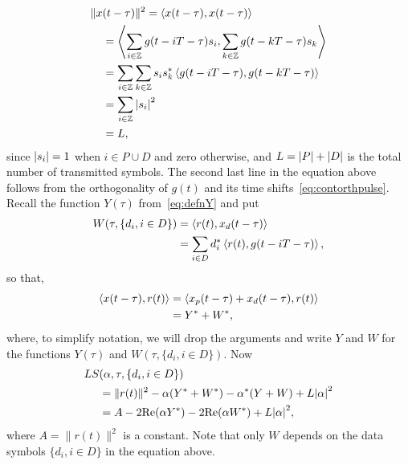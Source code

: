 \documentclass[journal]{IEEEtranTCOM}
\begin{document}
\begin{align*}
\|x&(t - \tau)\|^2 = \left\langle x(t - \tau) , x(t - \tau) \right\rangle \\
&= \left\langle \sum_{i\in{\mathbb Z}}g(t - iT - \tau)s_i , \sum_{k\in{\mathbb Z}}g(t - kT - \tau)s_k \right\rangle \\
&= \sum_{i\in{\mathbb Z}}\sum_{k\in{\mathbb Z}} s_is_k^* \left\langle g(t - iT - \tau) , g(t - kT - \tau) \right\rangle \\
&=  \sum_{i \in {\mathbb Z}} {\left\vert s_i \right\vert}^2 \\
&=  L,
\end{align*}
since ${\left\vert s_i \right\vert} = 1$ when $i \in P \cup D$ and zero otherwise, and $L = {\left\vert P \right\vert} + {\left\vert D \right\vert}$ is the total number of transmitted symbols.  The second last line in the equation above follows from the orthogonality of $g(t)$ and its time shifts~\eqref{eq:contorthpulse}.  Recall the function $Y(\tau)$ from~\eqref{eq:defnY} and put
\begin{align*}
W(\tau,\{d_i, i \in D\}) &= \left\langle r(t) , x_d(t - \tau) \right\rangle \\
&= \sum_{i \in D} d_i^*\left\langle r(t) , g(t - iT - \tau) \right\rangle,
\end{align*}
so that,
\begin{align*}
\left\langle x(t - \tau) , r(t) \right\rangle &= \left\langle x_p(t - \tau) + x_d(t - \tau) , r(t) \right\rangle \\
&= Y^* + W^*,
\end{align*}
where, to simplify notation, we will drop the arguments and write $Y$ and $W$ for the functions $Y(\tau)$ and $W(\tau,\{d_i, i \in D\})$.  Now
\begin{align}
LS&(\alpha,\tau,\{d_i, i \in D\}) \nonumber \\
&= \|r(t)\|^2 - \alpha (Y^*+W^*) - \alpha^*(Y+W) + L \abs{\alpha}^2  \nonumber \\
&= A - 2\re(\alpha Y^*) - 2\re(\alpha W^*) + L \abs{\alpha}^2, \label{eq:LSallsimple}
\end{align}
where $A = \|r(t)\|^2$ is a constant.  Note that only $W$ depends on the data symbols $\{d_i, i \in D\}$ in the equation above.
\end{document}
